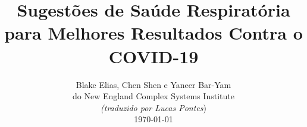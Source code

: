 \documentclass[onecolumn,journal]{IEEEtran}
\begin{document}
\title{\color{Brown}  Sugestões de Saúde Respiratória para Melhores Resultados Contra o COVID-19 \\
\vspace{-0.35ex}}
\author{Blake Elias, Chen Shen e Yaneer Bar-Yam \\ do New England Complex Systems Institute \\
\vspace{+0.35ex}
\small{\textit{(traduzido por Lucas Pontes})}\\
 \today
  \vspace{-8ex} \\
\textbf{}
 }

\maketitle




\thispagestyle{empty} %




\end{document}
